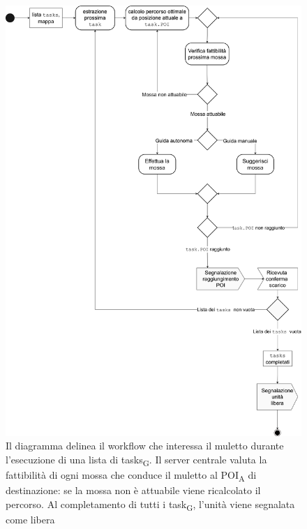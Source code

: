 \begin{figure}[H]
	\centering
	\includegraphics[scale=0.37]{res/images/diagramma_di_attivita2.png}
	\caption[Diagramma di \gls{attivita}\textsubscript{G} per l'evasione di una lista di \glspl{task}\textsubscript{G} da parte di un muletto]{Il diagramma delinea il workflow che interessa il muletto durante l'esecuzione di una lista di \glspl{task}\textsubscript{G}. Il server centrale valuta la fattibilità di ogni mossa che conduce il muletto al \acrshort{POI}\textsubscript{A} di destinazione: se la mossa non è attuabile viene ricalcolato il percorso. Al completamento di tutti i \gls{task}\textsubscript{G}, l'unità viene segnalata come libera}
\end{figure}





